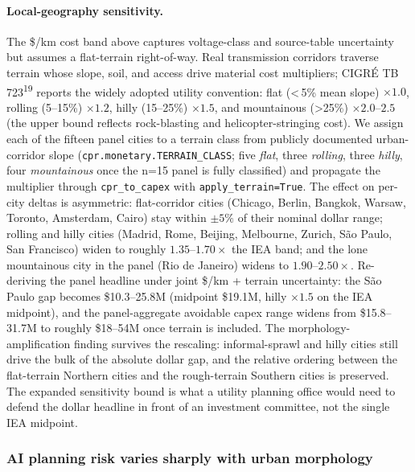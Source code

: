 \documentclass[10pt,a4paper]{article}
\begin{document}
\paragraph{Local-geography sensitivity.} The \$/km cost band above
captures voltage-class and source-table uncertainty but assumes a
flat-terrain right-of-way. Real transmission corridors traverse
terrain whose slope, soil, and access drive material cost
multipliers; CIGR\'E TB 723\textsuperscript{19} reports the widely
adopted utility convention: flat (<\,5\% mean slope) $\times 1.0$,
rolling (5--15\%) $\times 1.2$, hilly (15--25\%) $\times 1.5$, and
mountainous (>25\%) $\times 2.0$--$2.5$ (the upper bound reflects
rock-blasting and helicopter-stringing cost). We assign each of
the fifteen panel cities to a terrain class from publicly
documented urban-corridor slope (\texttt{cpr.monetary.TERRAIN\_CLASS};
five \emph{flat}, three \emph{rolling}, three \emph{hilly}, four
\emph{mountainous} once the n=15 panel is fully classified) and
propagate the multiplier through \texttt{cpr\_to\_capex} with
\texttt{apply\_terrain=True}.
The effect on per-city deltas is asymmetric:
flat-corridor cities (Chicago, Berlin, Bangkok, Warsaw, Toronto,
Amsterdam, Cairo) stay within $\pm 5\%$ of their nominal dollar
range; rolling and hilly cities (Madrid, Rome, Beijing, Melbourne,
Zurich, S\~ao Paulo, San Francisco) widen
to roughly $1.35$--$1.70\times$ the IEA band; and the lone
mountainous city in the panel (Rio de Janeiro)
widens to $1.90$--$2.50\times$.
Re-deriving the panel headline under joint
\$/km + terrain uncertainty: the S\~ao Paulo gap becomes
\$10.3--25.8M (midpoint \$19.1M, hilly $\times 1.5$ on the IEA
midpoint), and the panel-aggregate avoidable capex range widens
from \$15.8--31.7M to roughly \$18--54M once terrain is included.
The morphology-amplification finding survives the rescaling:
informal-sprawl and hilly cities still drive the bulk of the
absolute dollar gap, and the relative ordering between the
flat-terrain Northern cities and the rough-terrain Southern
cities is preserved. The expanded sensitivity bound is what a
utility planning office would need to defend the dollar headline
in front of an investment committee, not the single IEA midpoint.

\subsubsection{AI planning risk varies sharply with urban morphology}
\end{document}
